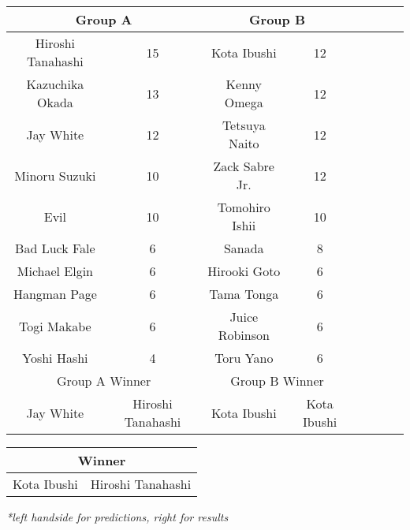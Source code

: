 \documentclass[landscape]{article}
\newcommand{\abl}{\cellcolor{red}}
\newcommand{\bbl}{\cellcolor{blue}}
\begin{document}
\vspace{10pt}
\begin{tabular}{|c|c|c|c|c|c|c|c|}
  \hline
  \multicolumn{2}{|c|}{\abl Group A} & \multicolumn{2}{|c|}{\bbl Group B} \\
  \hline
  Hiroshi Tanahashi & 15 & Kota Ibushi & 12 \\
  \hline
  Kazuchika Okada & 13 & Kenny Omega & 12 \\
  \hline
  Jay White & 12 & Tetsuya Naito & 12 \\
  \hline
  Minoru Suzuki & 10 & Zack Sabre Jr. & 12 \\
  \hline
  Evil & 10 & Tomohiro Ishii & 10 \\
  \hline
  Bad Luck Fale & 6 & Sanada & 8 \\
  \hline
  Michael Elgin & 6 & Hirooki Goto & 6 \\
  \hline
  Hangman Page & 6 & Tama Tonga & 6 \\
  \hline
  Togi Makabe & 6 & Juice Robinson & 6 \\
  \hline
  Yoshi Hashi & 4 & Toru Yano & 6 \\
  \hline\hline
  \multicolumn{2}{|c|}{\cellcolor{magenta} Group A Winner} &  \multicolumn{2}{|c|}{\cellcolor{cyan} Group B Winner} \\
  \hline
  Jay White & Hiroshi Tanahashi & Kota Ibushi & Kota Ibushi \\
  \hline
\end{tabular}

\vspace{10pt}
\begin{tabular}{|c|c|}
  \hline
  \multicolumn{2}{|c|}{\cellcolor{orange} Winner} \\
  \hline
  Kota Ibushi & Hiroshi Tanahashi \\
  \hline
\end{tabular}

\vspace{10pt}
\textit{*left handside for predictions, right for results}
\end{document}
